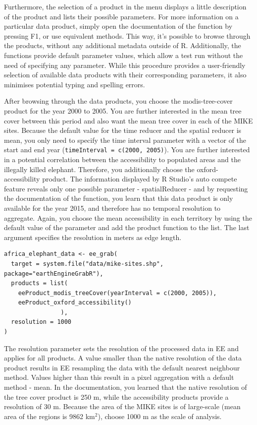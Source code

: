 Furthermore, the selection of a product in the menu displays a little description of the product and lists their possible parameters. For more information on a particular data product, simply open the documentation of the function by pressing F1, or use equivalent methods. This way, it's possible to browse through the products, without any additional metadata outside of R. Additionally, the functions provide default parameter values, which allow a test run without the need of specifying any parameter. While this procedure provides a user-friendly selection of available data products with their corresponding parameters, it also minimises potential typing and spelling errors.

After browsing through the data products, you choose the modis-tree-cover product for the year 2000 to 2005. You are further interested in the mean tree cover between this period and also want the mean tree cover in each of the MIKE sites. Because the default value for the time reducer and the spatial reducer is mean, you only need to specify the time interval parameter with a vector of the start and end year (\texttt{timeInterval = c(2000, 2005)}). You are further interested in a potential correlation between the accessibility to populated areas and the illegally killed elephant. Therefore, you additionally choose the oxford-accessibility product. The information displayed by R Studio's auto compete feature reveals only one possible parameter - spatialReducer - and by requesting the documentation of the function, you learn that this data product is only available for the year 2015, and therefore has no temporal resolution to aggregate. Again, you choose the mean accessibility in each territory by using the default value of the parameter and add the product function to the list. The last argument specifies the resolution in meters as edge length. 


\begin{lstlisting}
africa_elephant_data <- ee_grab(
  target = system.file("data/mike-sites.shp", package="earthEngineGrabR"),
  products = list(
    eeProduct_modis_treeCover(yearInterval = c(2000, 2005)),
    eeProduct_oxford_accessibility()
                ),
  resolution = 1000
)

\end{lstlisting}

The resolution parameter sets the resolution of the processed data in EE and applies for all products. A value smaller than the native resolution of the data product results in EE resampling the data with the default nearest neighbour method. Values higher than this result in a pixel aggregation with a default method - mean. In the documentation, you learned that the native resolution of the tree cover product is 250 m, while the accessibility products provide a resolution of 30 m. Because the area of the MIKE sites is of large-scale (mean area of the regions is 9862 km$^2$), choose 1000 m as the scale of analysis. 



